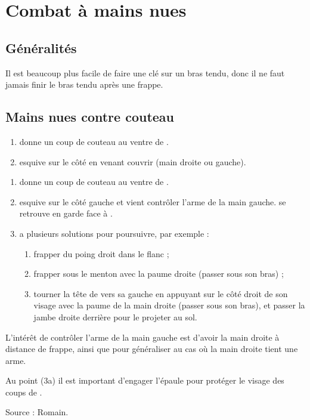 \chapter{Combat à mains nues}

\section{Généralités}

Il est beaucoup plus facile de faire une clé sur un bras tendu, donc il ne faut jamais finir le bras tendu après une frappe.


\section{Mains nues contre couteau}


\begin{exercice}

\begin{enumerate}
	\item \A donne un coup de couteau au ventre de \D.
	
	\item \D esquive sur le côté en venant couvrir (main droite ou gauche).
\end{enumerate}

\end{exercice}



\begin{technique}

\begin{enumerate}
	\item \A donne un coup de couteau au ventre de \D.
	
	\item \D esquive sur le côté gauche et vient contrôler l'arme de la main gauche.
	\D se retrouve en garde face à \A.
	
	\item \D a plusieurs solutions pour poursuivre, par exemple :
	\begin{enumerate}
		\item frapper du poing droit dans le flanc ;
		
		\item frapper \A sous le menton avec la paume droite (passer sous son bras) ;
		
		\item tourner la tête de \A vers sa gauche en appuyant sur le côté droit de son visage avec la paume de la main droite (passer sous son bras), et passer la jambe droite derrière \A pour le projeter au sol.
	\end{enumerate}

\end{enumerate}

L'intérêt de contrôler l'arme de la main gauche est d'avoir la main droite à distance de frappe, ainsi que pour généraliser au cas où la main droite tient une arme.

Au point (3a) il est important d'engager l'épaule pour protéger le visage des coups de \A.

Source : Romain.

\end{technique}



